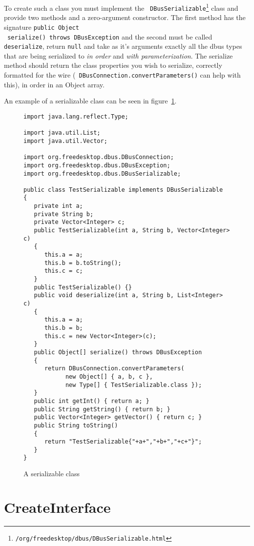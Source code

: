 \documentclass[a4paper,12pt]{article}
\begin{document}
To create such a class you must implement the {\tt
DBusSerializable\footnote{\javadocroot/org/freedesktop/dbus/DBusSerializable.html}}
class and provide two methods and a zero-argument constructor. The first method
has the signature {\tt public Object\[\] serialize() throws DBusException} and
the second must be called {\tt deserialize}, return {\tt null} and take as it's
arguments exactly all the dbus types that are being serialized to {\em in
order} and {\em with parameterization}. The serialize method should return the
class properties you wish to serialize, correctly formatted for the wire ({\tt
DBusConnection.convertParameters()} can help with this), in order in an Object
array.

An example of a serializable class can be seen in figure~\ref{fig:serializable}.


\begin{figure}[htb]
\begin{center}
\begin{verbatim}
import java.lang.reflect.Type;

import java.util.List;
import java.util.Vector;

import org.freedesktop.dbus.DBusConnection;
import org.freedesktop.dbus.DBusException;
import org.freedesktop.dbus.DBusSerializable;

public class TestSerializable implements DBusSerializable
{
   private int a;
   private String b;
   private Vector<Integer> c;
   public TestSerializable(int a, String b, Vector<Integer> c)
   {
      this.a = a;
      this.b = b.toString();
      this.c = c;
   }
   public TestSerializable() {}
   public void deserialize(int a, String b, List<Integer> c)
   {
      this.a = a;
      this.b = b;
      this.c = new Vector<Integer>(c);
   }
   public Object[] serialize() throws DBusException
   {
      return DBusConnection.convertParameters(
            new Object[] { a, b, c }, 
            new Type[] { TestSerializable.class });
   }
   public int getInt() { return a; }
   public String getString() { return b; }
   public Vector<Integer> getVector() { return c; }
   public String toString()
   {
      return "TestSerializable{"+a+","+b+","+c+"}";
   }
}
\end{verbatim}
\end{center}
\caption{A serializable class}
\label{fig:serializable}
\end{figure}



\section{CreateInterface}
\label{sec:create}
\end{document}
